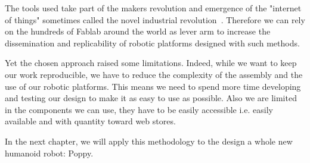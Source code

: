 The tools used take part of the makers revolution and emergence of the "internet of things" sometimes called the novel industrial revolution~\cite{anderson}. Therefore we can rely on the hundreds of Fablab around the world as lever arm to increase the dissemination and replicability of robotic platforms designed with such methods.

Yet the chosen approach raised some limitations. Indeed, while we want to keep our work reproducible, we have to reduce the complexity of the assembly and the use of our robotic platforms. This means we need to spend more time developing and testing our design to make it as easy to use as possible. Also we are limited in the components we can use, they have to be easily accessible i.e. easily available and with quantity toward web stores.


In the next chapter, we will apply this methodology to the design a whole new humanoid robot: Poppy.


